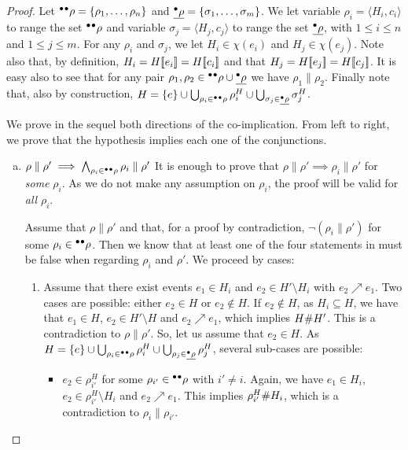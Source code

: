 \begin{proof}
Let ${}^\bullet{}^\bullet\rho = \{\rho_1, \ldots, \rho_n\}$ and $\underline{{}^\bullet\rho} =
\{\sigma_1, \ldots, \sigma_m\}$.  We let variable $\rho_i = \langle H_i, c_i
\rangle$ to range the set ${}^\bullet{}^\bullet\rho$ and variable $\sigma_j = \langle
H_j, c_j \rangle$ to range the set $\underline{{}^\bullet\rho}$, with $1 \le i \le n$ and
$1 \le j \le m$.  For any $\rho_i$ and $\sigma_j$, we let $H_i \in \chi (e_i)$
and $H_j \in \chi (e_j)$.  Note also that, by definition, $H_i = H [\![ e_i]\!] =
H[\![ c_i]\!]$ and that $H_j = H[\![ e_j]\!] = H[\![ c_j]\!]$.  It is easy also to see
that for any pair $\rho_1, \rho_2 \in {}^\bullet{}^\bullet\rho \cup \underline{{}^\bullet\rho}$ we
have $\rho_1 \parallel \rho_2$.  Finally note that, also by construction, $H =
\{e\} \cup \bigcup_{\rho_i \in {}^\bullet{}^\bullet\rho} \rho^H_i \cup \bigcup_{\sigma_j
\in \underline{{}^\bullet\rho}} \sigma^H_j$.

We prove in the sequel both directions of the co-implication.  From left to
right, we prove that the hypothesis implies each one of the conjunctions.

\begin{enumerate}[(a)]
\item $\rho \parallel \rho' \implies \bigwedge_{\rho_i \in {}^\bullet{}^\bullet\rho} \rho_i \parallel \rho'$  It is enough to prove that $\rho \parallel
\rho' \implies \rho_i \parallel \rho'$ for \emph{some} $\rho_i$.  As we do not
make any assumption on $\rho_i$, the proof will be valid for \emph{all}
$\rho_i$.

Assume that $\rho \parallel \rho'$ and that, for a proof by contradiction,
$\lnot (\rho_i \parallel \rho')$ for some $\rho_i \in {}^\bullet{}^\bullet\rho$.  Then we
know that at least one of the four statements in  must be
false when regarding $\rho_i$ and $\rho'$.  We proceed by cases:

\begin{enumerate}[1.]
\item Assume that there exist events $e_1 \in H_i$ and $e_2 \in H' \setminus
H_i$ with $e_2 \nearrow e_1$.  Two cases are possible: either $e_2 \in H$ or
$e_2 \notin H$.  If $e_2 \notin H$, as $H_i \subseteq H$, we have that $e_1 \in
H$, $e_2 \in H' \setminus H$ and $e_2 \nearrow e_1$, which implies $H \mathord{\#}
H'$.  This is a contradiction to $\rho \parallel \rho'$.  So, let us assume
that $e_2 \in H$.  As $H = \{e\} \cup \bigcup_{\rho_i \in {}^\bullet{}^\bullet\rho}
\rho^H_i \cup \bigcup_{\rho_j \in \underline{{}^\bullet\rho}} \rho^H_j$, several
sub-cases are possible:

\begin{itemize}
\item $e_2 \in \rho^H_{i'}$ for some $\rho_{i'} \in {}^\bullet{}^\bullet\rho$ with $i'
\not= i$.  Again, we have $e_1 \in H_i$, $e_2 \in \rho^H_{i'} \setminus H_i$
and $e_2 \nearrow e_1$.  This implies $\rho^H_{i'} \mathord{\#} H_i$, which is a
contradiction to $\rho_i \parallel \rho_{i'}$.


\end{itemize}
\end{enumerate}
\end{enumerate}
\end{proof}

